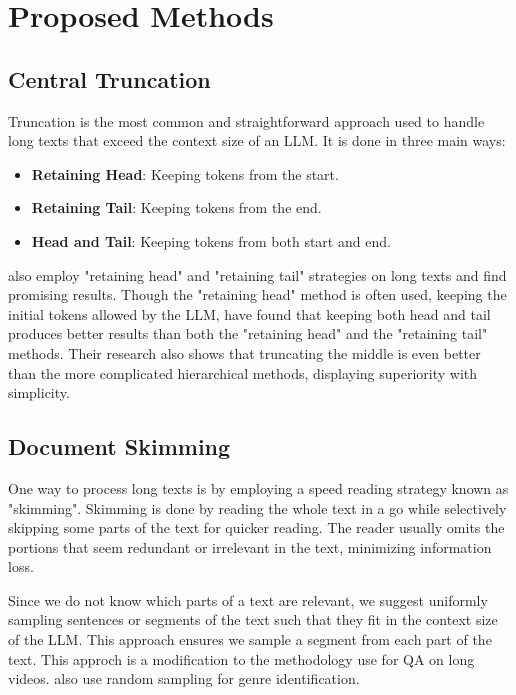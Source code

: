 \section{Proposed Methods}


\subsection{Central Truncation}

Truncation is the most common and straightforward approach used to handle long texts
that exceed the context size of an LLM.
It is done in three main ways:

\begin{itemize}
	\item \textbf{Retaining Head}: Keeping tokens from the start.
	\item \textbf{Retaining Tail}: Keeping tokens from the end.
	\item \textbf{Head and Tail}: Keeping tokens from both start and end.
\end{itemize}

\citet{worsham-kalita-2018-genre} also employ "retaining head" and "retaining tail"
strategies on long texts and find promising results.
Though the "retaining head" method is often used, keeping the initial tokens allowed
by the LLM, \citet{sun2019fine} have found that keeping both head and tail produces
better results than both the "retaining head" and the "retaining tail" methods.
Their research also shows that truncating the middle is even better than the more
complicated hierarchical methods, displaying superiority with simplicity.


\subsection{Document Skimming}

One way to process long texts is by employing a speed reading strategy known as
"skimming".
Skimming is done by reading the whole text in a go while selectively skipping some
parts of the text for quicker reading.
The reader usually omits the portions that seem redundant or irrelevant in the text,
minimizing information loss.

Since we do not know which parts of a text are relevant, we suggest uniformly sampling
sentences or segments of the text such that they fit in the context size of the LLM.
This approach ensures we sample a segment from each part of the text.
This approch is a modification to the methodology \citet{wang2024videoagent} use for
QA on long videos. \citet{worsham-kalita-2018-genre} also use random sampling for genre
identification.


